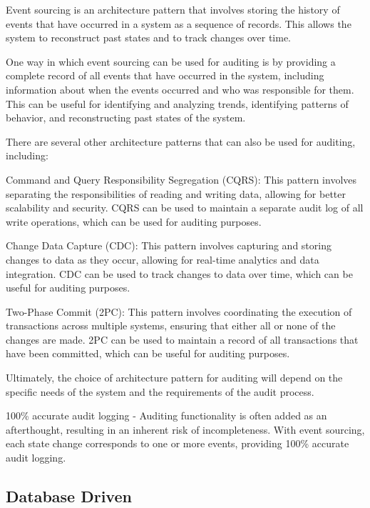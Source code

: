 Event sourcing is an architecture pattern that involves storing the history of events that have occurred in a system as a sequence of records. This allows the system to reconstruct past states and to track changes over time.

One way in which event sourcing can be used for auditing is by providing a complete record of all events that have occurred in the system, including information about when the events occurred and who was responsible for them. This can be useful for identifying and analyzing trends, identifying patterns of behavior, and reconstructing past states of the system.

There are several other architecture patterns that can also be used for auditing, including:

Command and Query Responsibility Segregation (CQRS): This pattern involves separating the responsibilities of reading and writing data, allowing for better scalability and security. CQRS can be used to maintain a separate audit log of all write operations, which can be used for auditing purposes.

Change Data Capture (CDC): This pattern involves capturing and storing changes to data as they occur, allowing for real-time analytics and data integration. CDC can be used to track changes to data over time, which can be useful for auditing purposes.

Two-Phase Commit (2PC): This pattern involves coordinating the execution of transactions across multiple systems, ensuring that either all or none of the changes are made. 2PC can be used to maintain a record of all transactions that have been committed, which can be useful for auditing purposes.

Ultimately, the choice of architecture pattern for auditing will depend on the specific needs of the system and the requirements of the audit process.

100\% accurate audit logging - Auditing functionality is often added as an afterthought, resulting in an inherent risk of incompleteness. With event sourcing, each state change corresponds to one or more events, providing 100\% accurate audit logging.~\citep{richardson2018microservices} %

\subsection{Database Driven}


